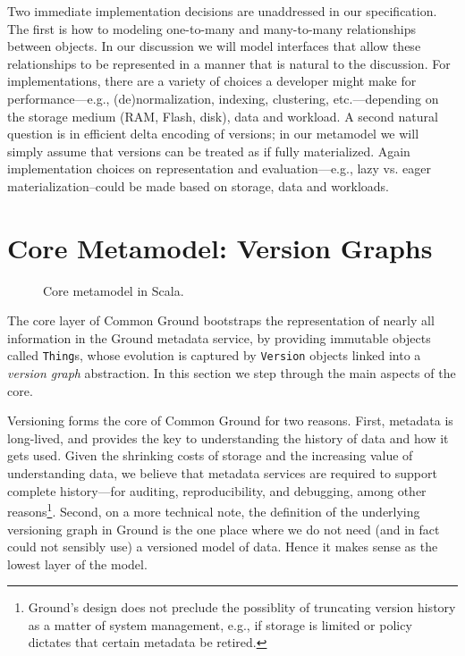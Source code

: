 \documentclass{article}
\newcommand{\core}{core\xspace}
\newcommand{\Core}{Core\xspace}
\newcommand{\version}{\texttt{Version}\xspace}
\newcommand{\thing}{\texttt{Thing}\xspace}
\newcommand{\versiongraph}{version graph\xspace}
\begin{document}
Two immediate implementation decisions are unaddressed in our specification.  The first is how to modeling one-to-many and many-to-many relationships between objects.  In our discussion we will model interfaces that allow these relationships to be represented in a manner that is natural to the discussion.  For implementations, there are a variety of choices a developer might make for performance---e.g., (de)normalization, indexing, clustering, etc.---depending on the storage medium (RAM, Flash, disk), data and workload.  A second natural question is in efficient delta encoding of versions; in our metamodel we will simply assume that versions can be treated as if fully materialized.  Again implementation choices on representation and evaluation---e.g., lazy vs. eager materialization--could be made based on storage, data and workloads.

\section{\Core Metamodel: Version Graphs}


\begin{figure}[ht]
\begin{scriptsize}
\begin{multicols}{2}

\end{multicols}
\end{scriptsize}
\caption{\Core metamodel in Scala.}
\label{fig:core}
\end{figure}

The \core layer of Common Ground bootstraps the representation of nearly all information in the Ground metadata service, by providing immutable objects called {\thing}s, whose evolution is captured by {\version} objects linked into a \emph{\versiongraph} abstraction.  In this section we step through the main aspects of the \core.

Versioning forms the core of Common Ground for two reasons.  First, metadata is long-lived, and provides the key to understanding the history of data and how it gets used.  Given the shrinking costs of storage and the increasing value of understanding data, we believe that metadata services are required to support complete history---for auditing, reproducibility, and debugging, among other reasons\footnote{Ground's design does not preclude the possiblity of truncating version history as a matter of system management, e.g., if storage is limited or policy dictates that certain metadata be retired.}.
Second, on a more technical note, the definition of the underlying versioning graph in Ground is the one place where we do not need (and in fact could not sensibly use) a versioned model of data.  Hence it 
makes sense as the lowest layer of the model.
\end{document}
